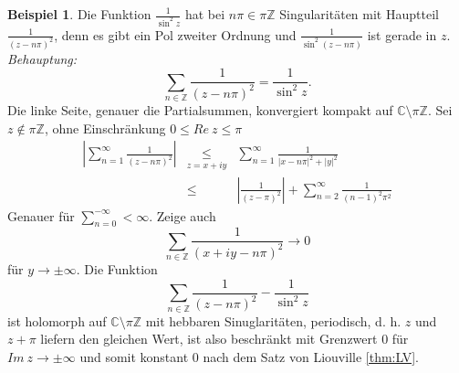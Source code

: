 \documentclass[11pt,titlepage]{article}
\theoremstyle{definition}
\newtheorem{example}[theorem]{Beispiel}
\theoremstyle{remark}
\begin{document}
	\begin{example}
		Die Funktion $\frac{1}{\sin^2 z}$ hat bei $n\pi\in\pi\mathbb{Z}$ Singularitäten mit Hauptteil 
		$\frac{1}{(z-n\pi)^2}$, denn es gibt ein Pol zweiter Ordnung und $\frac{1}{\sin^2(z-n\pi)}$ ist gerade in $z$. \\
		\textsl{Behauptung:} 
		\[ \sum_{n\in\mathbb{Z}}\frac{1}{(z-n\pi)^2}=\frac{1}{\sin^2 z}. \]
		Die linke Seite, genauer die Partialsummen, konvergiert kompakt auf $\mathbb{C}\setminus\pi\mathbb{Z}$.
		Sei $z\notin\pi\mathbb{Z}$, ohne Einschränkung $0\leq Re\  z\leq\pi$
		\begin{eqnarray*}
			\left| \sum_{n=1}^{\infty} \frac{1}{(z-n\pi)^2} \right| &\underset{z=x+iy}{\leq}& \sum_{n=1}^{\infty} 
			\frac{1}{|x-n\pi|^2+|y|^2} \\
			&\leq& \left| \frac{1}{(z-\pi)^2}\right| + \sum_{n=2}^{\infty} \frac{1}{(n-1)^2 \pi^2}
		\end{eqnarray*}
		Genauer für $\sum_{n=0}^{-\infty}<\infty$. Zeige auch
		\[ \sum_{n\in\mathbb{Z}} \frac{1}{(x+iy-n\pi)^2} \to 0 \]
		für $y\to\pm\infty$.
		Die Funktion
		\[ \sum_{n\in\mathbb{Z}} \frac{1}{(z-n\pi)^2}-\frac{1}{\sin^2 z} \]
		ist holomorph auf $\mathbb{C}\setminus \pi\mathbb{Z}$ mit hebbaren Sinuglaritäten, periodisch, d. h. $z$ 
		und $z+\pi$ liefern den gleichen Wert, ist also beschränkt mit Grenzwert $0$ für $Im\ z\to\pm\infty$ und somit 
		konstant $0$ nach dem Satz von Liouville \ref{thm:LV}.
	\end{example}
\end{document}
